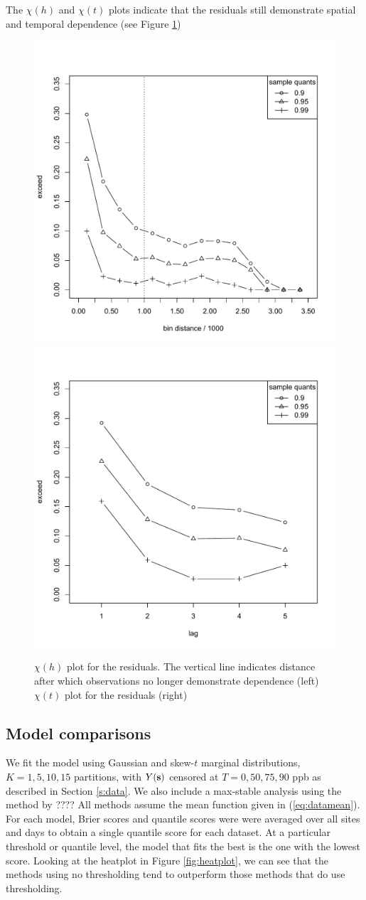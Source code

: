 \documentclass[11pt]{article}
\begin{document}
The $\chi(h)$ and $\chi(t)$ plots indicate that the residuals still demonstrate spatial and temporal dependence (see Figure \ref{fig:chi-st})
\begin{center}
\begin{figure}
  \includegraphics[width=0.5\linewidth]{plots/chi-h-ozone.pdf}
  \includegraphics[width=0.5\linewidth]{plots/chi-t-ozone.pdf}
  \caption{$\chi(h)$ plot for the residuals. The vertical line indicates distance after which observations no longer demonstrate dependence (left) $\chi(t)$ plot for the residuals (right)}
  \label{fig:chi-st}
\end{figure}
\end{center}

\subsection{Model comparisons}
We fit the model using Gaussian and skew-$t$ marginal distributions, $K=1, 5, 10, 15$ partitions, with $Y(\mbox{\bf s})$ censored at $T = 0, 50, 75, 90$ ppb as described in Section \ref{s:data}.
We also include a max-stable analysis using the method by ????
All methods assume the mean function given in (\ref{eq:datamean}).
For each model, Brier scores and quantile scores were were averaged over all sites and days to obtain a single quantile score for each dataset.
At a particular threshold or quantile level, the model that fits the best is the one with the lowest score.
Looking at the heatplot in Figure \ref{fig:heatplot}, we can see that the methods using no thresholding tend to outperform those methods that do use thresholding.
\end{document}
